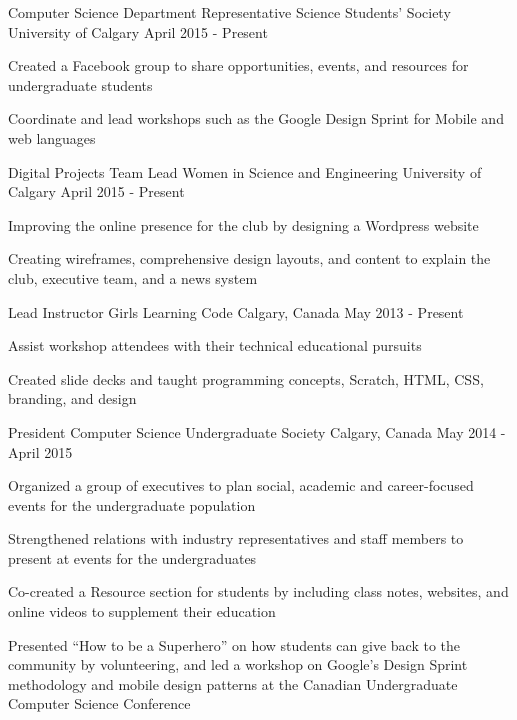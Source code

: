 \begin{cventries}
  \cventry
    {Computer Science Department Representative}
    {Science Students' Society}
    {University of Calgary}
    {April 2015 - Present}
    {
      \begin{cvitems}
        \item {Created a Facebook group to share opportunities, events, and resources for undergraduate students}
        \item {Coordinate and lead workshops such as the Google Design Sprint for Mobile and web languages}
      \end{cvitems}
    }
  \cventry
    {Digital Projects Team Lead}
    {Women in Science and Engineering}
    {University of Calgary}
    {April 2015 - Present}
    {
      \begin{cvitems}
        \item {Improving the online presence for the club by designing a Wordpress website}
        \item {Creating wireframes, comprehensive design layouts, and content to explain the club, executive team, and a news system}
      \end{cvitems}
    }
  \cventry
    {Lead Instructor}
    {Girls Learning Code}
    {Calgary, Canada}
    {May 2013 - Present}
    {
      \begin{cvitems}
        \item {Assist workshop attendees with their technical educational pursuits}
        \item {Created slide decks and taught programming concepts, Scratch, HTML, CSS, branding, and design}
      \end{cvitems}
    }
  \cventry
    {President}
    {Computer Science Undergraduate Society}
    {Calgary, Canada}
    {May 2014 - April 2015}
    {
      \begin{cvitems}
        \item {Organized a group of executives to plan social, academic and career-focused events for the undergraduate population}
        \item {Strengthened relations with industry representatives and staff members to present at events for the undergraduates}
        \item {Co-created a Resource section for students by including class notes, websites, and online videos to supplement their education}
        \item {Presented ``How to be a Superhero'' on how students can give back to the community by volunteering, and led a workshop on Google's Design Sprint methodology and mobile design patterns at the Canadian Undergraduate Computer Science Conference}

\end{cvitems}}
\end{cventries}
